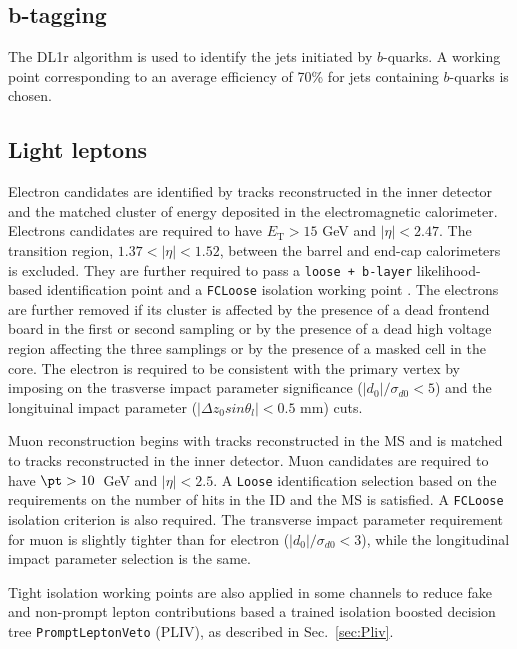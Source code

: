 \subsection{b-tagging}
The {\texttt\scriptsize DL1r} \cite{btag1} algorithm is used to identify the jets initiated by $b$-quarks. A working point corresponding to an average efficiency of 70\% for jets containing $b$-quarks is chosen.

\subsection{Light leptons}
Electron candidates are identified by tracks reconstructed in the inner detector and the matched cluster of energy deposited in the electromagnetic calorimeter. Electrons candidates are required to have $E_{\text{T}} > 15$ GeV and $|\eta|<2.47$. The transition region, $1.37<|\eta|<1.52$, between the barrel and end-cap calorimeters is excluded. They are further required to pass a \texttt{loose + b-layer} likelihood-based identification point \cite{ElectronID} and a \texttt{FCLoose} isolation working point \cite{IsolationWP}. The electrons are further removed  if its cluster is affected by the presence of a dead frontend board in the first or second sampling or by the presence of a dead high voltage region affecting the three samplings or by the presence of a masked cell in the core. The electron is required to be consistent with the primary vertex by imposing on the trasverse impact parameter significance ($|d_0|/\sigma_{d0}<5$) and 
the longituinal impact parameter ($|\Delta z_0 sin\theta_l|<0.5$ mm) cuts. 

Muon reconstruction begins with tracks reconstructed in the MS and is matched to tracks reconstructed in the inner detector. Muon candidates are required to have $\pt>10$~GeV and $|\eta|<2.5$. A \texttt{Loose} identification selection \cite{MuonSelectionTool} based on the requirements on the number of hits in the ID and the MS is satisfied. A \texttt{FCLoose} isolation \cite{IsolationWP} criterion is also required. The transverse impact parameter requirement for muon is slightly tighter than for electron ($|d_0|/\sigma_{d0}<3$), while the longitudinal impact
parameter selection is the same. 

Tight isolation working points are also applied in some channels to reduce fake and non-prompt lepton contributions based a trained isolation boosted decision tree \texttt{PromptLeptonVeto} 
(PLIV), as described in Sec.~\ref{sec:Pliv}.

